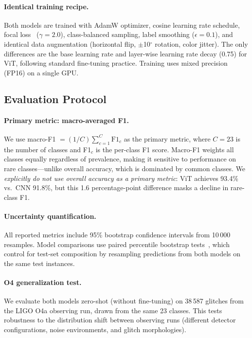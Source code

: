 \documentclass[12pt]{article}
\newcommand{\Nclasses}{23}
\newcommand{\NOfour}{38\,587}
\newcommand{\vitAccuracy}{93.4\%}
\newcommand{\cnnAccuracy}{91.8\%}
\begin{document}
\paragraph{Identical training recipe.}
Both models are trained with AdamW optimizer, cosine learning rate schedule,
focal loss~\citep{Lin2017} ($\gamma = 2.0$), class-balanced sampling, label
smoothing ($\epsilon = 0.1$), and identical data augmentation (horizontal flip,
$\pm$10$^\circ$ rotation, color jitter).
The only differences are the base learning rate and layer-wise learning rate
decay (0.75) for ViT, following standard fine-tuning practice.
Training uses mixed precision (FP16) on a single GPU.

\subsection{Evaluation Protocol}
\label{sec:evaluation}

\paragraph{Primary metric: macro-averaged F1.}
We use macro-F1 $= (1/C)\sum_{c=1}^{C} \text{F1}_c$ as the primary metric,
where $C = \Nclasses$ is the number of classes and F1$_c$ is the per-class
F1 score.
Macro-F1 weights all classes equally regardless of prevalence, making it
sensitive to performance on rare classes---unlike overall accuracy, which is
dominated by common classes.
We \emph{explicitly do not use overall accuracy as a primary metric}: ViT
achieves \vitAccuracy{} vs.\ CNN \cnnAccuracy, but this 1.6 percentage-point
difference masks a decline in rare-class F1.

\paragraph{Uncertainty quantification.}
All reported metrics include 95\% bootstrap confidence intervals from 10\,000
resamples.
Model comparisons use paired percentile bootstrap tests~\citep{Efron1993},
which control for test-set composition by resampling predictions from both
models on the same test instances.

\paragraph{O4 generalization test.}
We evaluate both models zero-shot (without fine-tuning) on \NOfour{} glitches
from the LIGO O4a observing run, drawn from the same \Nclasses{} classes.
This tests robustness to the distribution shift between observing runs
(different detector configurations, noise environments, and glitch
morphologies).
\end{document}
